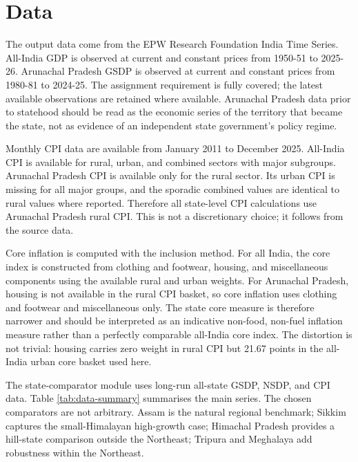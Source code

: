 \documentclass[11pt,a4paper]{article}
\begin{document}
\section{Data}

The output data come from the EPW Research Foundation India Time Series. All-India GDP is observed at current and constant prices from 1950-51 to 2025-26. Arunachal Pradesh GSDP is observed at current and constant prices from 1980-81 to 2024-25. The assignment requirement is fully covered; the latest available observations are retained where available. Arunachal Pradesh data prior to statehood should be read as the economic series of the territory that became the state, not as evidence of an independent state government's policy regime.

Monthly CPI data are available from January 2011 to December 2025. All-India CPI is available for rural, urban, and combined sectors with major subgroups. Arunachal Pradesh CPI is available only for the rural sector. Its urban CPI is missing for all major groups, and the sporadic combined values are identical to rural values where reported. Therefore all state-level CPI calculations use Arunachal Pradesh rural CPI. This is not a discretionary choice; it follows from the source data.

Core inflation is computed with the inclusion method. For all India, the core index is constructed from clothing and footwear, housing, and miscellaneous components using the available rural and urban weights. For Arunachal Pradesh, housing is not available in the rural CPI basket, so core inflation uses clothing and footwear and miscellaneous only. The state core measure is therefore narrower and should be interpreted as an indicative non-food, non-fuel inflation measure rather than a perfectly comparable all-India core index. The distortion is not trivial: housing carries zero weight in rural CPI but 21.67 points in the all-India urban core basket used here.

The state-comparator module uses long-run all-state GSDP, NSDP, and CPI data. Table \ref{tab:data-summary} summarises the main series. The chosen comparators are not arbitrary. Assam is the natural regional benchmark; Sikkim captures the small-Himalayan high-growth case; Himachal Pradesh provides a hill-state comparison outside the Northeast; Tripura and Meghalaya add robustness within the Northeast.
\end{document}
